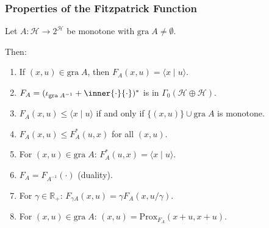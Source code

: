 \documentclass[aspectratio=169,10pt]{beamer}
\newcommand{\gra}{\mathrm{gra}\;}
\newcommand{\Prox}{\mathrm{Prox}}
\newcommand{\inprod}[2]{\langle #1 \mid #2 \rangle}
\newcommand{\Hilbert}{\mathcal{H}}
\newcommand{\Reals}{\mathbb{R}}
\begin{document}
\begin{frame}
    \frametitle{Properties of the Fitzpatrick Function}

    \begin{theorem}
        Let $A : \Hilbert \to 2^{\Hilbert}$ be monotone with $\gra A \neq \emptyset$.

        Then:
        \begin{enumerate}
            \item[\textbf{(i)}] If $(x, u) \in \gra A$, then $F_A(x, u) = \inprod{x}{u}$.
            \item[\textbf{(ii)}] $F_A = (\iota_{\gra A^{-1}} + \inner{\cdot}{\cdot})^*$ is in $\Gamma_0(\Hilbert \oplus \Hilbert)$.
            \item[\textbf{(iii)}] $F_A(x, u) \leq \inprod{x}{u}$ if and only if $\{(x,u)\} \cup \gra A$ is monotone.
            \item[\textbf{(iv)}] $F_A(x, u) \leq F_A^*(u, x)$ for all $(x, u)$.
            \item[\textbf{(v)}] For $(x, u) \in \gra A$: $F_A^*(u, x) = \inprod{x}{u}$.
            \item[\textbf{(vi)}] $F_A = F_{A^{-1}}(\cdot)$ (duality).
            \item[\textbf{(vii)}] For $\gamma \in \Reals_+$: $F_{\gamma A}(x, u) = \gamma F_A(x, u/\gamma)$.
            \item[\textbf{(viii)}] For $(x, u) \in \gra A$: $(x, u) = \Prox_{F_A}(x + u, x + u)$.
        \end{enumerate}
    \end{theorem}
\end{frame}
\end{document}
